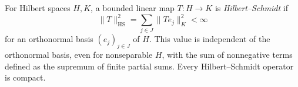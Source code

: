 
For Hilbert spaces $H,K$, a bounded linear map $T:H\to K$ is \emph{Hilbert--Schmidt} if
\[
\|T\|_{\mathrm{HS}}^2=\sum_{j\in J}\|Te_j\|_K^2<\infty
\]
for an orthonormal basis $(e_j)_{j\in J}$ of $H$. This value is independent of the orthonormal basis, even for nonseparable $H$, with the sum of nonnegative terms defined as the supremum of finite partial sums. Every Hilbert--Schmidt operator is compact.
